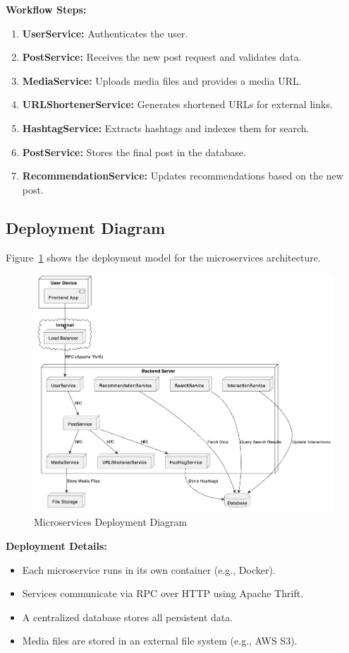 \documentclass[a4paper,12pt]{article}
\begin{document}
\textbf{Workflow Steps:}
\begin{enumerate}
    \item \textbf{UserService:} Authenticates the user.
    \item \textbf{PostService:} Receives the new post request and validates data.
    \item \textbf{MediaService:} Uploads media files and provides a media URL.
    \item \textbf{URLShortenerService:} Generates shortened URLs for external links.
    \item \textbf{HashtagService:} Extracts hashtags and indexes them for search.
    \item \textbf{PostService:} Stores the final post in the database.
    \item \textbf{RecommendationService:} Updates recommendations based on the new post.
\end{enumerate}

\subsection{Deployment Diagram}

Figure~\ref{fig:microservice-deployment} shows the deployment model for the microservices architecture.

\begin{figure}[H]
    \centering
    \includegraphics[width=0.9\linewidth]{microservice_deployment.png}
    \caption{Microservices Deployment Diagram}
    \label{fig:microservice-deployment}
\end{figure}

\textbf{Deployment Details:}
\begin{itemize}
    \item Each microservice runs in its own container (e.g., Docker).
    \item Services communicate via RPC over HTTP using Apache Thrift.
    \item A centralized database stores all persistent data.
    \item Media files are stored in an external file system (e.g., AWS S3).
\end{itemize}
\end{document}
